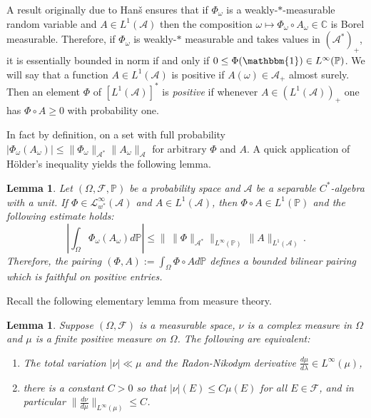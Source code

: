 \documentclass{article}
\newcommand{\one}{\mathbbm{1}}
\newcommand{\C}{\mathbb C}
\newcommand{\A}{\mathcal{A}}
\renewcommand{\P}{\mathbb{P}}
\newcommand{\<}{\langle}
\renewcommand{\>}{\rangle}
\newtheorem{lem}[thm]{Lemma}
\theoremstyle{definition}
\numberwithin{equation}{section}
\begin{document}
A result originally due to Han\v{s} \cite[Theorem 2.14]{Bharucha-Reid} ensures that if $\Phi_\omega$ is a weakly-$\ast$-measurable random variable and $A\in L^1(\A)$ then the composition $\omega \mapsto \Phi_\omega \circ A_\omega \in \C$ is Borel measurable. Therefore, if $\Phi_\omega$ is weakly-$\ast$ measurable and takes values in $(\A^*)_+$, it is essentially bounded in norm if and only if $0\le \Phi(\one)\in L^\infty(\P)$. We will say that a function $A\in L^1(\A)$ is positive if $A(\omega) \in \A_+$ almost surely. Then an element $\Phi$ of $[L^1(\A)]^*$ is \emph{positive} if whenever $A\in (L^1(\A))_+$ one has $\Phi\circ A \ge 0$ with probability one. 

 In fact by definition, on a set with full probability $|\Phi_\omega (A_\omega)| \le \|\Phi_\omega\|_{\A^*} \|A_\omega\|_{\A}$ for arbitrary $\Phi$ and $A$. A quick application of H\"older's inequality yields the following lemma.

\begin{lem}\label{lem:pairing}
	Let $(\Omega, \mathcal{F}, \P)$ be a probability space and $\A$ be a separable $C^*$-algebra with a unit. If $\Phi\in \mathcal{L}^\infty_{w^*}(\A)$ and $A\in L^1(\A)$, then $\Phi \circ A \in L^1(\P)$ and the following estimate holds: 
	\begin{equation}
	\left| \int_\Omega \Phi_\omega (A_\omega) d\P\right| \le \|\,\|\Phi\|_{\A^*}\|_{L^\infty(\P)}\, \|A\|_{L^1(\A)}\,.
	\end{equation} Therefore, the pairing $(\Phi,A):= \int_\Omega \Phi\circ A d\P$ defines a bounded bilinear pairing which is faithful on positive entries. 
\end{lem}



Recall the following elementary lemma from measure theory. 
\begin{lem}\label{lem:essbddRND}
	Suppose $(\Omega, \mathcal{F})$ is a measurable space, $\nu$ is a complex measure in $\Omega$ and $\mu$ is a finite positive measure on $\Omega$. The following are equivalent: 
	\begin{enumerate}
		\item  The total variation $|\nu| \ll \mu$ and the Radon-Nikodym derivative $\frac{d\mu}{d\lambda} \in L^\infty(\mu)$, 
		\item  there is a constant $C>0$ so that $|\nu|(E)\le C \mu(E)$ for all $E\in \mathcal{F}$, and in particular $\|\frac{d\nu}{d\mu}\|_{L^\infty(\mu)}\le C$. 
	\end{enumerate}
\end{lem} 
\end{document}
